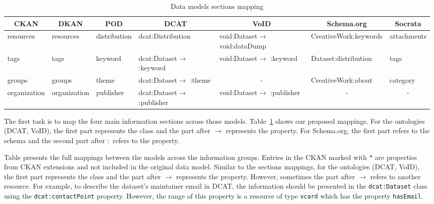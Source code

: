 \begin{table}[!htbp]
\centering
\tiny
\begin{tabular}{|l|l|l|l|l|l|l|}
\hline
\multicolumn{1}{|c|}{\textbf{CKAN}} & \multicolumn{1}{c|}{\textbf{DKAN}} & \multicolumn{1}{c|}{\textbf{POD}} & \multicolumn{1}{c|}{\textbf{DCAT}}     & \multicolumn{1}{c|}{\textbf{VoID}}     & \multicolumn{1}{c|}{\textbf{Schema.org}} & \multicolumn{1}{c|}{\textbf{Socrata}} \\ \hline
resources                           & resources                          & distribution                      & dcat:Distribution                      & void:Dataset$\rightarrow$ void:dataDump & CreativeWork:keywords                    & attachments                           \\ \hline
tags                                & tags                               & keyword                           & dcat:Dataset$\rightarrow$ :keyword   & void:Dataset$\rightarrow$ :keyword   & Dataset:distribution                     & tags                                  \\ \hline
groups                              & groups                             & theme                             & dcat:Dataset$\rightarrow$ :theme     &   \multicolumn{1}{c|}{-}                                      & CreativeWork:about                       & category                              \\ \hline
organization                        & organization                       & publisher                         & dcat:Dataset$\rightarrow$ :publisher &   void:Dataset$\rightarrow$ :publisher                                     & \multicolumn{1}{c|}{-}                   & \multicolumn{1}{c|}{-}                                      \\ \hline
\end{tabular}
\caption{Data models sections mapping}
\label{table:models_section_mappings}
\end{table}

The first task is to map the four main information sections across those models. Table~\ref{table:models_section_mappings} shows our proposed mappings. For the ontologies (DCAT, VoID), the first part represents the class and the part after $\rightarrow$ represents the property. For Schema.org, the first part refers to the schema and the second part after $:$ refers to the property.

Table presents the full mappings between the models across the information groups. Entries in the CKAN marked with $\ast$ are properties from CKAN extensions and not included in the original data model. Similar to the sections mappings, for the ontologies (DCAT, VoID), the first part represents the class and the part after $\rightarrow$ represents the property. However, sometimes the part after $\rightarrow$ refers to another resource. For example, to describe the dataset's maintainer email in DCAT, the information should be presented in the \texttt{dcat:Dataset} class using the \texttt{dcat:contactPoint} property. However, the range of this property is a resource of type \texttt{vcard} which has the property \texttt{hasEmail}.

